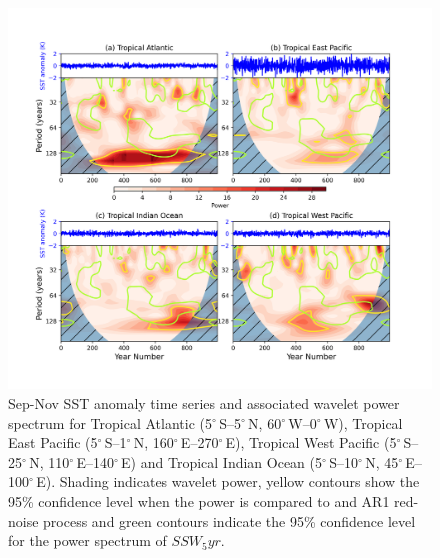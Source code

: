 \documentclass[wcd, manuscript]{copernicus}
\begin{document}
\begin{center}
\begin{figure}[h!]
\noindent\includegraphics[width = \linewidth]{new_changed_figures/SSTs_tropical_wavelet_new_levels.png}
\caption{Sep-Nov SST anomaly time series and associated wavelet power spectrum for Tropical Atlantic (5$^{\circ}$\,S–5$^{\circ}$\,N, 60$^{\circ}$\,W–0$^{\circ}$\,W), Tropical East Pacific (5$^{\circ}$\,S–1$^{\circ}$\,N, 160$^{\circ}$\,E–270$^{\circ}$\,E), Tropical West Pacific (5$^{\circ}$\,S–25$^{\circ}$\,N, 110$^{\circ}$\,E–140$^{\circ}$\,E) and Tropical Indian Ocean (5$^{\circ}$\,S–10$^{\circ}$\,N, 45$^{\circ}$\,E–100$^{\circ}$\,E). Shading indicates wavelet power, yellow contours show the 95\% confidence level when the power is compared to and AR1 red-noise process and green contours indicate the 95\% confidence level for the power spectrum of $SSW_5yr$.}
\label{fig3}
\end{figure}
\end{center}
\end{document}
